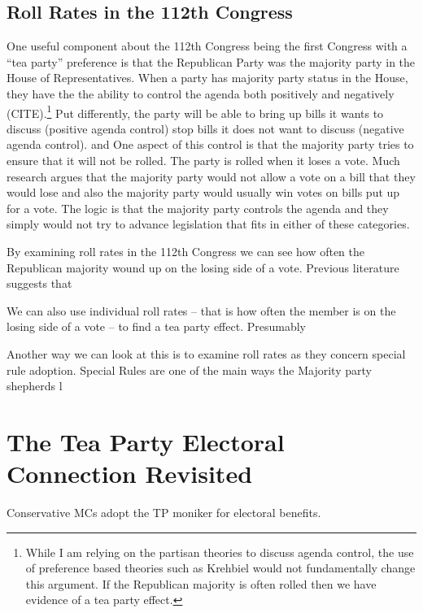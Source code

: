\documentclass[12pt]{article}
\begin{document}
\subsection{Roll Rates in the 112th Congress}
One useful component about the 112th Congress being the first Congress with a ``tea party'' preference is that the Republican Party was the majority party in the House of Representatives.
When a party has majority party status in the House, they have the the ability to control the agenda both positively and negatively (CITE).\footnote{While I am relying on the partisan theories to discuss agenda control, the use of preference based theories such as Krehbiel would not fundamentally change this argument. If the Republican majority is often rolled then we have evidence of a tea party effect.} Put differently, the party will be able to bring up bills it wants to discuss (positive agenda control) stop bills it does not want to discuss (negative agenda control). and  One aspect of this control is that the majority party tries to ensure that it will not be rolled. The party is rolled when it loses a vote. Much research argues that the majority party would not allow a vote on a bill that they would lose and also the majority party would usually win votes on bills put up for a vote. The logic is that the majority party controls the agenda and they simply would not try to advance legislation that fits in either of these categories.

By examining roll rates in the 112th Congress we can see how often the Republican majority wound up on the losing side of a vote. Previous literature suggests that 

We can also use individual roll rates -- that is how often the member is on the losing side of a vote -- to find a tea party effect. Presumably 

Another way we can look at this is to examine roll rates as they concern special rule adoption. Special Rules are one of the main ways the Majority party shepherds l

\section{The Tea Party Electoral Connection Revisited}
Conservative MCs adopt the TP moniker for electoral benefits.

\newpage
    {}


\end{document}
